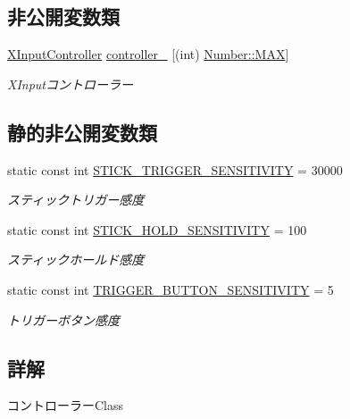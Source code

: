 \subsection*{非公開変数類}
\begin{DoxyCompactItemize}
\item 
\mbox{\hyperlink{class_controller_1_1_x_input_controller}{X\+Input\+Controller}} \mbox{\hyperlink{class_controller_a8f71d4e54911c80ea0c113f4b72ccfec}{controller\+\_\+}} \mbox{[}(int) \mbox{\hyperlink{class_controller_ad81882021d5a5c77855c7d656899cc62a26a4b44a837bf97b972628509912b4a5}{Number\+::\+M\+AX}}\mbox{]}
\begin{DoxyCompactList}\small\item\em X\+Inputコントローラー \end{DoxyCompactList}\end{DoxyCompactItemize}
\subsection*{静的非公開変数類}
\begin{DoxyCompactItemize}
\item 
static const int \mbox{\hyperlink{class_controller_a724390d67344586ab54e87b676d2b5bf}{S\+T\+I\+C\+K\+\_\+\+T\+R\+I\+G\+G\+E\+R\+\_\+\+S\+E\+N\+S\+I\+T\+I\+V\+I\+TY}} = 30000
\begin{DoxyCompactList}\small\item\em スティックトリガー感度 \end{DoxyCompactList}\item 
static const int \mbox{\hyperlink{class_controller_a52591fcc8144e0fb274c6a42b5593e1b}{S\+T\+I\+C\+K\+\_\+\+H\+O\+L\+D\+\_\+\+S\+E\+N\+S\+I\+T\+I\+V\+I\+TY}} = 100
\begin{DoxyCompactList}\small\item\em スティックホールド感度 \end{DoxyCompactList}\item 
static const int \mbox{\hyperlink{class_controller_a1f1051035784f6b5dfdd028021706f6d}{T\+R\+I\+G\+G\+E\+R\+\_\+\+B\+U\+T\+T\+O\+N\+\_\+\+S\+E\+N\+S\+I\+T\+I\+V\+I\+TY}} = 5
\begin{DoxyCompactList}\small\item\em トリガーボタン感度 \end{DoxyCompactList}\end{DoxyCompactItemize}


\subsection{詳解}
コントローラー\+Class 

